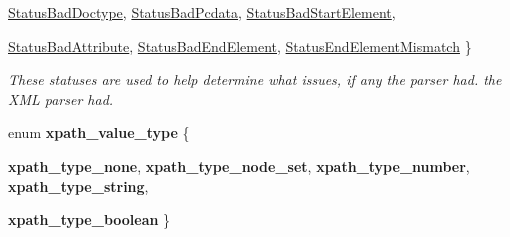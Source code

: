 \begin{DoxyCompactItemize}
\hyperlink{namespacephys_1_1xml_ae7aabb879b21c73d8183a54470f8917fa22f9163dc29ca7017022e4ce96c97ef9}{StatusBadDoctype}, 
\hyperlink{namespacephys_1_1xml_ae7aabb879b21c73d8183a54470f8917fab30b3a432145b0e9c6595e75da773628}{StatusBadPcdata}, 
\hyperlink{namespacephys_1_1xml_ae7aabb879b21c73d8183a54470f8917fadbc5b334b4215ce2332073de46c58155}{StatusBadStartElement}, 
\par
\hyperlink{namespacephys_1_1xml_ae7aabb879b21c73d8183a54470f8917fac5fdddc5cc4d127aa5c53efb85846ccf}{StatusBadAttribute}, 
\hyperlink{namespacephys_1_1xml_ae7aabb879b21c73d8183a54470f8917fa72532447020c081f343c4a719add7450}{StatusBadEndElement}, 
\hyperlink{namespacephys_1_1xml_ae7aabb879b21c73d8183a54470f8917fa6b8d817142e0898ad9b1c61cfa54b8ea}{StatusEndElementMismatch}
 \}
\begin{DoxyCompactList}\small\item\em These statuses are used to help determine what issues, if any the parser had. the XML parser had. \item\end{DoxyCompactList}\item 
enum {\bfseries xpath\_\-value\_\-type} \{ \par
{\bfseries xpath\_\-type\_\-none}, 
{\bfseries xpath\_\-type\_\-node\_\-set}, 
{\bfseries xpath\_\-type\_\-number}, 
{\bfseries xpath\_\-type\_\-string}, 
\par
{\bfseries xpath\_\-type\_\-boolean}
 \}
\end{DoxyCompactItemize}
